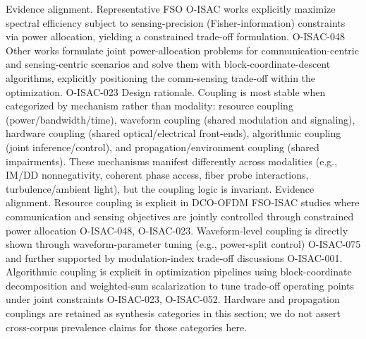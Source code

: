 {}Evidence alignment. Representative FSO O-ISAC works explicitly maximize spectral efficiency subject to sensing-precision (Fisher-information) constraints via power allocation, yielding a constrained trade-off formulation. O-ISAC-048 \markdownRendererSoftLineBreak
{}Other works formulate joint power-allocation problems for communication-centric and sensing-centric scenarios and solve them with block-coordinate-descent algorithms, explicitly positioning the comm-sensing trade-off within the optimization. O-ISAC-023 \markdownRendererInterblockSeparator
{}
\markdownRendererSectionEnd \markdownRendererSectionBegin
{}\markdownRendererInterblockSeparator
{}Design rationale. Coupling is most stable when categorized by mechanism rather than modality: resource coupling (power/bandwidth/time), waveform coupling (shared modulation and signaling), hardware coupling (shared optical/electrical front-ends), algorithmic coupling (joint inference/control), and propagation/environment coupling (shared impairments). These mechanisms manifest differently across modalities (e.g., IM/DD nonnegativity, coherent phase access, fiber probe interactions, turbulence/ambient light), but the coupling logic is invariant.\markdownRendererParagraphSeparator
{}Evidence alignment. Resource coupling is explicit in DCO-OFDM FSO-ISAC studies where communication and sensing objectives are jointly controlled through constrained power allocation O-ISAC-048, O-ISAC-023.\markdownRendererSoftLineBreak
{}Waveform-level coupling is directly shown through waveform-parameter tuning (e.g., power-split control) O-ISAC-075 and further supported by modulation-index trade-off discussions O-ISAC-001.\markdownRendererSoftLineBreak
{}Algorithmic coupling is explicit in optimization pipelines using block-coordinate decomposition and weighted-sum scalarization to tune trade-off operating points under joint constraints O-ISAC-023, O-ISAC-052.\markdownRendererSoftLineBreak
{}Hardware and propagation couplings are retained as synthesis categories in this section; we do not assert cross-corpus prevalence claims for those categories here.\markdownRendererInterblockSeparator

